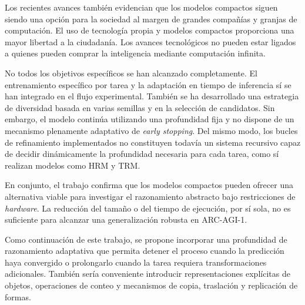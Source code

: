 \documentclass[11pt,a4paper,spanish]{book}
\numberwithin{equation}{chapter}
\numberwithin{figure}{chapter}
\begin{document}
Los recientes avances también evidencian que los modelos compactos siguen siendo una 
opción para la sociedad al margen de grandes compañías y granjas de computación.
El uso de tecnología propia y modelos compactos proporciona una mayor libertad a la ciudadanía.
Los avances tecnológicos no pueden estar ligados a quienes pueden comprar la inteligencia
mediante computación infinita.

No todos los objetivos específicos se han alcanzado completamente. El
entrenamiento específico por tarea y la adaptación en tiempo de inferencia sí
se han integrado en el flujo experimental. También se ha desarrollado una
estrategia de diversidad basada en varias semillas y en la selección de
candidatos. Sin embargo, el modelo continúa utilizando una profundidad fija y
no dispone de un mecanismo plenamente adaptativo de \textit{early stopping}.
Del mismo modo, los bucles de refinamiento implementados no constituyen todavía
un sistema recursivo capaz de decidir dinámicamente la profundidad necesaria
para cada tarea, como sí realizan modelos como HRM y TRM.

En conjunto, el trabajo confirma que los modelos compactos pueden ofrecer una
alternativa viable para investigar el razonamiento abstracto bajo restricciones
de \textit{hardware}. La reducción del tamaño o del tiempo de
ejecución, por sí sola, no es suficiente para alcanzar una generalización
robusta en ARC-AGI-1.

Como continuación de este trabajo, se propone incorporar una profundidad de
razonamiento adaptativa que permita detener el proceso cuando la predicción haya
convergido o prolongarlo cuando la tarea requiera transformaciones adicionales.
También sería conveniente introducir representaciones explícitas de objetos,
operaciones de conteo y mecanismos de copia, traslación y replicación de formas.




\end{document}
